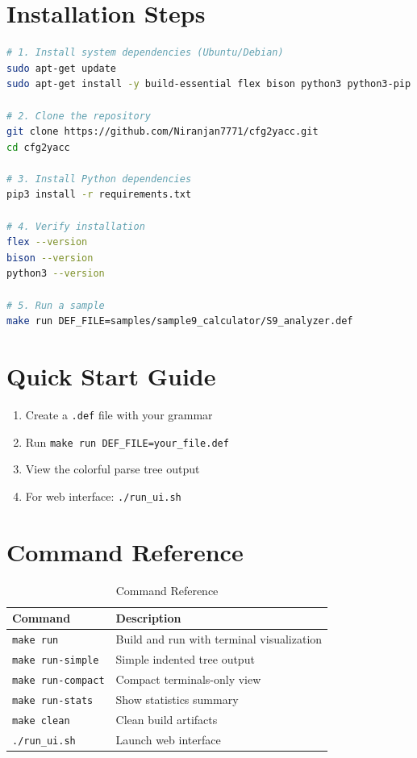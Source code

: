 \documentclass[a4paper,12pt]{report}
\begin{document}
\section{Installation Steps}
\begin{lstlisting}[language=bash, caption=Installation Commands]
# 1. Install system dependencies (Ubuntu/Debian)
sudo apt-get update
sudo apt-get install -y build-essential flex bison python3 python3-pip

# 2. Clone the repository
git clone https://github.com/Niranjan7771/cfg2yacc.git
cd cfg2yacc

# 3. Install Python dependencies
pip3 install -r requirements.txt

# 4. Verify installation
flex --version
bison --version
python3 --version

# 5. Run a sample
make run DEF_FILE=samples/sample9_calculator/S9_analyzer.def
\end{lstlisting}
\newpage
\section{Quick Start Guide}
\begin{enumerate}
    \item Create a \texttt{.def} file with your grammar
    \item Run \texttt{make run DEF\_FILE=your\_file.def}
    \item View the colorful parse tree output
    \item For web interface: \texttt{./run\_ui.sh}
\end{enumerate}

\section{Command Reference}
\begin{table}[H]
\centering
\begin{tabular}{|l|p{8cm}|}
\hline
\textbf{Command} & \textbf{Description} \\
\hline
\texttt{make run} & Build and run with terminal visualization \\
\texttt{make run-simple} & Simple indented tree output \\
\texttt{make run-compact} & Compact terminals-only view \\
\texttt{make run-stats} & Show statistics summary \\
\texttt{make clean} & Clean build artifacts \\
\texttt{./run\_ui.sh} & Launch web interface \\
\hline
\end{tabular}
\caption{Command Reference}
\label{tab:commands}
\end{table}
\end{document}
